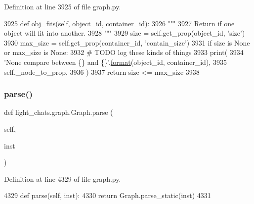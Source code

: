 Definition at line 3925 of file graph.\+py.


\begin{DoxyCode}
3925     \textcolor{keyword}{def }obj\_fits(self, object\_id, container\_id):
3926         \textcolor{stringliteral}{"""}
3927 \textcolor{stringliteral}{        Return if one object will fit into another.}
3928 \textcolor{stringliteral}{        """}
3929         size = self.get\_prop(object\_id, \textcolor{stringliteral}{'size'})
3930         max\_size = self.get\_prop(container\_id, \textcolor{stringliteral}{'contain\_size'})
3931         \textcolor{keywordflow}{if} size \textcolor{keywordflow}{is} \textcolor{keywordtype}{None} \textcolor{keywordflow}{or} max\_size \textcolor{keywordflow}{is} \textcolor{keywordtype}{None}:
3932             \textcolor{comment}{# TODO log these kinds of things}
3933             print(
3934                 \textcolor{stringliteral}{'None compare between \{\} and \{\}'}.\hyperlink{namespaceparlai_1_1chat__service_1_1services_1_1messenger_1_1shared__utils_a32e2e2022b824fbaf80c747160b52a76}{format}(object\_id, container\_id),
3935                 self.\_node\_to\_prop,
3936             )
3937         \textcolor{keywordflow}{return} size <= max\_size
3938 
\end{DoxyCode}
\mbox{\label{classlight__chats_1_1graph_1_1Graph_a5087252eb40253eacd115e777c092cd8}} 
\subsubsection{\texorpdfstring{parse()}{parse()}}
{\footnotesize\ttfamily def light\+\_\+chats.\+graph.\+Graph.\+parse (\begin{DoxyParamCaption}\item[{}]{self,  }\item[{}]{inst }\end{DoxyParamCaption})}



Definition at line 4329 of file graph.\+py.


\begin{DoxyCode}
4329     \textcolor{keyword}{def }parse(self, inst):
4330         \textcolor{keywordflow}{return} Graph.parse\_static(inst)
4331 
\end{DoxyCode}
\mbox{\label{classlight__chats_1_1graph_1_1Graph_a9aede2dd27f6a9ab66f38eaa5f649195}} 
